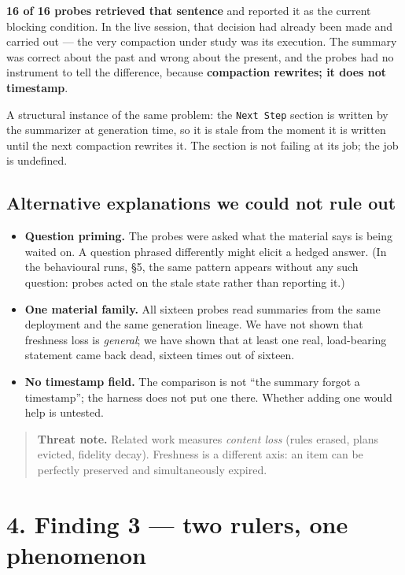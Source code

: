 \documentclass[
]{article}
\providecommand{\tightlist}{%
  \setlength{\itemsep}{0pt}\setlength{\parskip}{0pt}}
\begin{document}
\textbf{16 of 16 probes retrieved that sentence} and reported it as the
current blocking condition. In the live session, that decision had
already been made and carried out --- the very compaction under study
was its execution. The summary was correct about the past and wrong
about the present, and the probes had no instrument to tell the
difference, because \textbf{compaction rewrites; it does not timestamp}.

A structural instance of the same problem: the \texttt{Next\ Step}
section is written by the summarizer at generation time, so it is stale
from the moment it is written until the next compaction rewrites it. The
section is not failing at its job; the job is undefined.

\subsection{Alternative explanations we could not rule
out}\label{alternative-explanations-we-could-not-rule-out-1}

\begin{itemize}
\tightlist
\item
  \textbf{Question priming.} The probes were asked what the material
  says is being waited on. A question phrased differently might elicit a
  hedged answer. (In the behavioural runs, §5, the same pattern appears
  without any such question: probes acted on the stale state rather than
  reporting it.)
\item
  \textbf{One material family.} All sixteen probes read summaries from
  the same deployment and the same generation lineage. We have not shown
  that freshness loss is \emph{general}; we have shown that at least one
  real, load-bearing statement came back dead, sixteen times out of
  sixteen.
\item
  \textbf{No timestamp field.} The comparison is not ``the summary
  forgot a timestamp''; the harness does not put one there. Whether
  adding one would help is untested.
\end{itemize}

\begin{quote}
\textbf{Threat note.} Related work measures \emph{content loss} (rules
erased, plans evicted, fidelity decay). Freshness is a different axis:
an item can be perfectly preserved and simultaneously expired.
\end{quote}

\section{4. Finding 3 --- two rulers, one
phenomenon}\label{finding-3-two-rulers-one-phenomenon}
\end{document}
